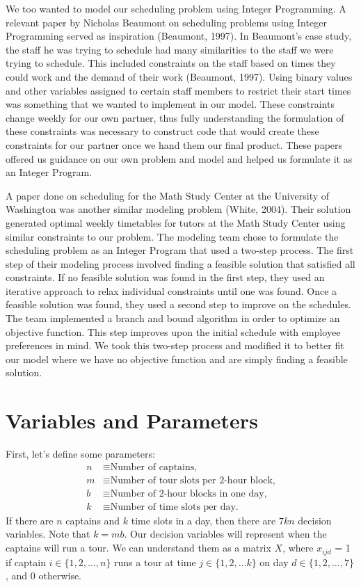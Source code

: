 \documentclass[12pt]{article}
\begin{document}
We too wanted to model our scheduling problem using Integer Programming. A relevant paper by Nicholas Beaumont on scheduling problems using Integer Programming served as inspiration (Beaumont, 1997). In Beaumont's case study, the staff he was trying to schedule had many similarities to the staff we were trying to schedule. This included constraints on the staff based on times they could work and the demand of their work (Beaumont, 1997). Using binary values and other variables assigned to certain staff members to restrict their start times was something that we wanted to implement in our model. These constraints change weekly for our own partner, thus fully understanding the formulation of these constraints was necessary to construct code that would create these constraints for our partner once we hand them our final product. These papers offered us guidance on our own problem and model and helped us formulate it as an Integer Program.

A paper done on scheduling for the Math Study Center at the University of Washington was another similar modeling problem (White, 2004). Their solution generated optimal weekly timetables for tutors at the Math Study Center using similar constraints to our problem. The modeling team chose to formulate the scheduling problem as an Integer Program that used a two-step process. The first step of their modeling process involved finding a feasible solution that satisfied all constraints. If no feasible solution was found in the first step, they used an iterative approach to relax individual constraints until one was found. Once a feasible solution was found, they used a second step to improve on the schedules. The team implemented a branch and bound algorithm in order to optimize an objective function. This step improves upon the initial schedule with employee preferences in mind. We took this two-step process and modified it to better fit our model where we have no objective function and are simply finding a feasible solution. 

\section*{Variables and Parameters} First, let's define some parameters:
\begin{align*}
n &\equiv \text{Number of captains,}\\
m &\equiv \text{Number of tour slots per 2-hour block,}\\
b &\equiv \text{Number of 2-hour blocks in one day,}\\
k &\equiv \text{Number of time slots per day.}
\end{align*}
If there are $n$ captains and $k$ time slots in a day, then there are $7kn$ decision variables. Note that $k = mb$. Our decision variables will represent when the captains will run a tour. We can understand them as a matrix $X$, where $x_{ijd}$ = 1 if captain $i \in \{1, 2, \dots, n\}$ runs a tour at time $j \in \{1, 2, \dots k\}$ on day $d \in \{1, 2, \dots, 7\}$, and 0 otherwise.
\end{document}
